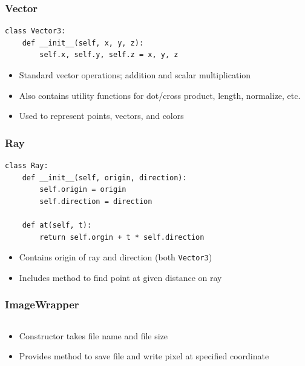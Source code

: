 \documentclass{beamer}
\begin{document}
\begin{frame}[fragile]
	\frametitle{Vector}
	\begin{verbatim}
class Vector3:
    def __init__(self, x, y, z):
        self.x, self.y, self.z = x, y, z
	\end{verbatim}
	\begin{itemize}
		\item Standard vector operations; addition and scalar multiplication
		\item Also contains utility functions for dot/cross product, length, normalize, etc.
		\item Used to represent points, vectors, and colors
	\end{itemize}
\end{frame}

\begin{frame}[fragile]
	\frametitle{Ray}
	\begin{verbatim}
class Ray:
    def __init__(self, origin, direction):
        self.origin = origin
        self.direction = direction
        
    def at(self, t):
        return self.orgin + t * self.direction
\end{verbatim}
	\begin{itemize}
		\item Contains origin of ray and direction (both \texttt{Vector3})
		\item Includes method to find point at given distance on ray
	\end{itemize}
\end{frame}

\begin{frame}
	\frametitle{ImageWrapper}
	\inputminted{python}{scripts/wrapper.py}
	\begin{itemize}
		\item Constructor takes file name and file size
		\item Provides method to save file and write pixel at specified coordinate
	\end{itemize}
\end{frame}
\end{document}
